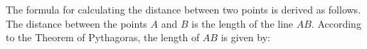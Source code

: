     \addtocounter{footnote}{-0}
    
        \label{m39107*id67214}The formula for calculating the distance between two points is derived as follows. The distance between the points \begin{math}A\end{math} and \begin{math}B\end{math} is the length of the line \begin{math}AB\end{math}. According to the Theorem of Pythagoras, the length of \begin{math}AB\end{math} is given by:\par 
        \label{m39107*id67261}\nopagebreak\noindent{}
    
